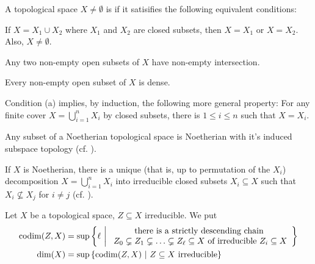 \documentclass[a4paper,parskip=full,numbers=enddot]{scrreprt}
\begin{document}
\begin{defi}
 A topological space $X\not=\emptyset$ is  if it satisifies the following equivalent conditions:
 \begin{alphanumerate}
    \item If $X = X_1\cup X_2$ where $X_1$ and $X_2$ are closed subsets, then $X=X_1$ or $X=X_2$. Also, $X\neq\emptyset$.
    \item Any two non-empty open subsets of $X$ have non-empty intersection.
    \item Every non-empty open subset of $X$ is dense.
 \end{alphanumerate}
\end{defi}
\begin{rem*}
	Condition (a) implies, by induction, the following more general property: 
	For any finite cover $X= \bigcup_{i=1}^n X_i$ by closed subsets, there is $1\leq i\leq n$ such that $X=X_i$.
\end{rem*}
\begin{prop}
 \begin{alphanumerate}
    \item 
        Any subset of a Noetherian topological space is Noetherian with it's induced subspace topology (cf. \cite[Remark~2.2.1]{alg1}).
    \item 
        If $X$ is Noetherian, there is a unique (that is, up to permutation of the $X_i$) decomposition $X = \bigcup_{i=1}^n X_i$ into irreducible closed subsets $X_i\subseteq X$ such that $X_i\not\subseteq X_j$ for $i\neq j$ (cf. \cite[Proposition~2.1.1]{alg1}).
 \end{alphanumerate}

\end{prop}
\begin{defi}
 Let $X$ be a topological space, $Z\subseteq X$ irreducible. We put 
 \begin{align*}
    \operatorname{codim}(Z,X) &= \sup\left\{\ell\ \middle|\  
    \begin{array}{c}
	    \text{there is a strictly descending chain }\\
	    Z_0 \subsetneq Z_1\subsetneq \ldots \subsetneq Z_\ell\subseteq X\text{ of irreducible }Z_i\subseteq X
    \end{array}\right\}\\
    \dim(X) &= \sup\left\{\operatorname{codim}(Z,X)\ \middle|\  Z\subseteq X \text{ irreducible}\right\}
 \end{align*}
\end{defi}
\end{document}
